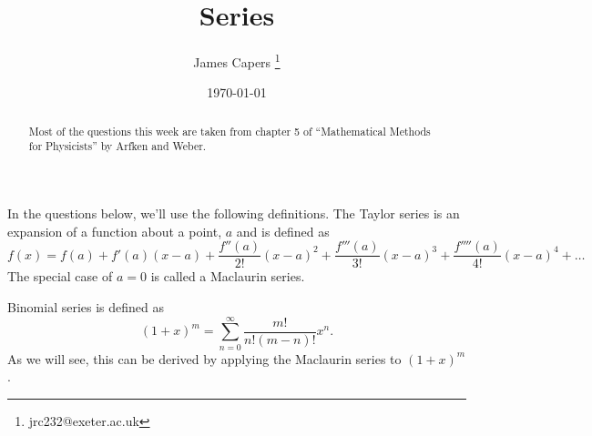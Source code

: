 \documentclass{article}
\title{Series}
\author{James Capers \thanks{jrc232@exeter.ac.uk}}
\date{\today}
\begin{document}
\maketitle

\begin{abstract}
Most of the questions this week are taken from chapter 5 of ``Mathematical Methods for Physicists'' by Arfken and Weber.
\end{abstract}

In the questions below, we'll use the following definitions.
The Taylor series is an expansion of a function about a point, $a$ and is defined as
\begin{equation}
	f(x) = f(a) + f'(a) (x-a) + \frac{f''(a)}{2!} (x-a)^2 + \frac{f'''(a)}{3!} (x-a)^3 + \frac{f''''(a)}{4!} (x-a)^4 + \ldots
\end{equation}
The special case of $a = 0$ is called a Maclaurin series.

Binomial series is defined as
\begin{equation}
	(1+x)^m = \sum_{n=0}^\infty \frac{m!}{n!(m-n)!} x^n .
\end{equation}
As we will see, this can be derived by applying the Maclaurin series to $(1+x)^m$.
\end{document}
